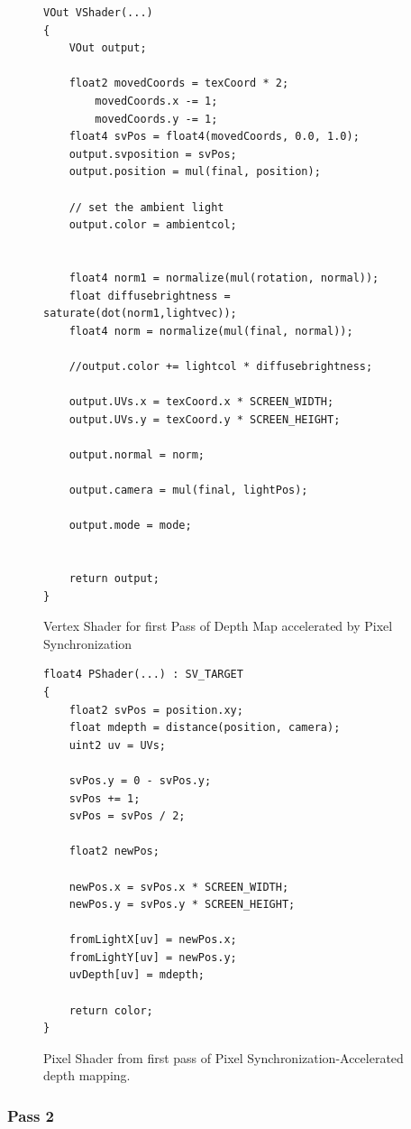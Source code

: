\documentclass[a4paper, 12pt]{article}
\begin{document}
\begin{figure}[h]
\begin{lstlisting}[breaklines=true, language=HLSL]
VOut VShader(...)
{
	VOut output;

	float2 movedCoords = texCoord * 2;
		movedCoords.x -= 1;
		movedCoords.y -= 1;
	float4 svPos = float4(movedCoords, 0.0, 1.0);
	output.svposition = svPos;
	output.position = mul(final, position);

	// set the ambient light
	output.color = ambientcol;

	
	float4 norm1 = normalize(mul(rotation, normal));
	float diffusebrightness = saturate(dot(norm1,lightvec));
	float4 norm = normalize(mul(final, normal));

	//output.color += lightcol * diffusebrightness;

	output.UVs.x = texCoord.x * SCREEN_WIDTH;
	output.UVs.y = texCoord.y * SCREEN_HEIGHT;

	output.normal = norm;

	output.camera = mul(final, lightPos);

	output.mode = mode;


	return output;
}
\end{lstlisting}
\caption{Vertex Shader for first Pass of Depth Map accelerated by Pixel 
Synchronization}
\label{code:VShaderPSDepth}
\end{figure}

\begin{figure}[h]

\begin{lstlisting}[breaklines=true, language=HLSL]
float4 PShader(...) : SV_TARGET 
{
	float2 svPos = position.xy;
	float mdepth = distance(position, camera);
	uint2 uv = UVs;

	svPos.y = 0 - svPos.y;
	svPos += 1;
	svPos = svPos / 2;

	float2 newPos;

	newPos.x = svPos.x * SCREEN_WIDTH;
	newPos.y = svPos.y * SCREEN_HEIGHT;

	fromLightX[uv] = newPos.x;
	fromLightY[uv] = newPos.y;
	uvDepth[uv] = mdepth;

	return color;
}
\end{lstlisting}
\caption{Pixel Shader from first pass of Pixel Synchronization-Accelerated 
depth mapping.}
\label{code:PixelShaderPSDepth}
\end{figure}

\subsubsection{Pass 2}
\end{document}
